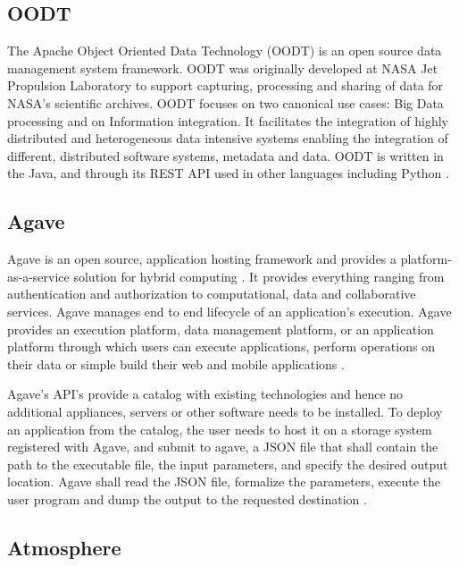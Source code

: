 \subsection{OODT}
     
     The Apache Object Oriented Data Technology (OODT) is an open
     source data management system framework. OODT was originally
     developed at NASA Jet Propulsion Laboratory to support capturing,
     processing and sharing of data for NASA's scientific
     archives. OODT focuses on two canonical use cases: Big Data
     processing and on Information integration. It facilitates the
     integration of highly distributed and heterogeneous data
     intensive systems enabling the integration of different,
     distributed software systems, metadata and data. OODT is written
     in the Java, and through its REST API used in other languages
     including Python \cite{www-oodt2}.
     
\subsection{Agave}

     Agave is an open source, application hosting framework and
     provides a platform-as-a-service solution for hybrid
     computing \cite{agave-paper}. It provides everything ranging
     from authentication and authorization to computational, data and
     collaborative services. Agave manages end to end lifecycle of an
     application’s execution.  Agave provides an execution platform,
     data management platform, or an application platform through
     which users can execute applications, perform operations on their
     data or simple build their web and mobile
     applications \cite{www-agaveapi-features}.

     Agave’s API’s provide a catalog with existing technologies and
     hence no additional appliances, servers or other software needs
     to be installed. To deploy an application from the catalog, the
     user needs to host it on a storage system registered with Agave,
     and submit to agave, a JSON file that shall contain the path to
     the executable file, the input parameters, and specify the
     desired output location. Agave shall read the JSON file,
     formalize the parameters, execute the user program and dump the
     output to the requested destination \cite{agave-paper}.

\subsection{Atmosphere}

